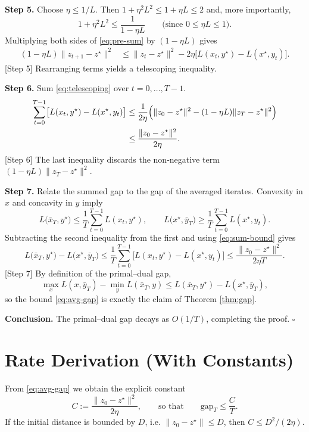 \documentclass{article}
\begin{document}
\bigskip
\noindent\textbf{Step 5.} Choose $\eta\le 1/L$. Then $1+\eta^{2}L^{2}\le 1+ \eta L\le 2$ and, more importantly,
\[
1+\eta^{2}L^{2}\le \frac{1}{1-\eta L}\qquad\text{(since }0\le\eta L\le1\text{)}.
\]
Multiplying both sides of \eqref{eq:pre-sum} by $(1-\eta L)$ gives
\begin{align}
(1-\eta L)\|z_{t+1}-z^{\star}\|^{2}
&\le \|z_{t}-z^{\star}\|^{2}
   -2\eta\bigl[L(x_{t},y^{\star})-L(x^{\star},y_{t})\bigr]. \label{eq:telescoping}
\end{align}
[Step 5] Rearranging terms yields a telescoping inequality.

\bigskip
\noindent\textbf{Step 6.} Sum \eqref{eq:telescoping} over $t=0,\dots,T-1$.
\begin{align}
\sum_{t=0}^{T-1}\bigl[L(x_{t},y^{\star})-L(x^{\star},y_{t})\bigr]
&\le \frac{1}{2\eta}\Bigl(\|z_{0}-z^{\star}\|^{2}
      -(1-\eta L)\|z_{T}-z^{\star}\|^{2}\Bigr) \nonumber\\
&\le \frac{\|z_{0}-z^{\star}\|^{2}}{2\eta}. \label{eq:sum-bound}
\end{align}
[Step 6] The last inequality discards the non‑negative term $(1-\eta L)\|z_{T}-z^{\star}\|^{2}$.

\bigskip
\noindent\textbf{Step 7.} Relate the summed gap to the gap of the averaged iterates.
Convexity in $x$ and concavity in $y$ imply
\[
L\bigl(\bar{x}_{T},y^{\star}\bigr)\le\frac{1}{T}\sum_{t=0}^{T-1}L(x_{t},y^{\star}),\qquad
L\bigl(x^{\star},\bar{y}_{T}\bigr)\ge\frac{1}{T}\sum_{t=0}^{T-1}L(x^{\star},y_{t}).
\]
Subtracting the second inequality from the first and using \eqref{eq:sum-bound} gives
\[
L\bigl(\bar{x}_{T},y^{\star}\bigr)-L\bigl(x^{\star},\bar{y}_{T}\bigr)
\le \frac{1}{T}\sum_{t=0}^{T-1}\bigl[L(x_{t},y^{\star})-L(x^{\star},y_{t})\bigr]
\le \frac{\|z_{0}-z^{\star}\|^{2}}{2\eta T}. \label{eq:avg-gap}
\]
[Step 7] By definition of the primal–dual gap,
\[
\max_{x}L(x,\bar{y}_{T})-\min_{y}L(\bar{x}_{T},y)
\le L(\bar{x}_{T},y^{\star})-L(x^{\star},\bar{y}_{T}),
\]
so the bound \eqref{eq:avg-gap} is exactly the claim of Theorem \ref{thm:gap}.

\bigskip
\noindent\textbf{Conclusion.} The primal–dual gap decays as $O(1/T)$, completing the proof. $\square$

\section*{Rate Derivation (With Constants)}
From \eqref{eq:avg-gap} we obtain the explicit constant
\[
C:=\frac{\|z_{0}-z^{\star}\|^{2}}{2\eta},
\qquad\text{so that}\qquad
\text{gap}_{T}\le \frac{C}{T}.
\]
If the initial distance is bounded by $D$, i.e. $\|z_{0}-z^{\star}\|\le D$, then $C\le D^{2}/(2\eta)$.
\end{document}
